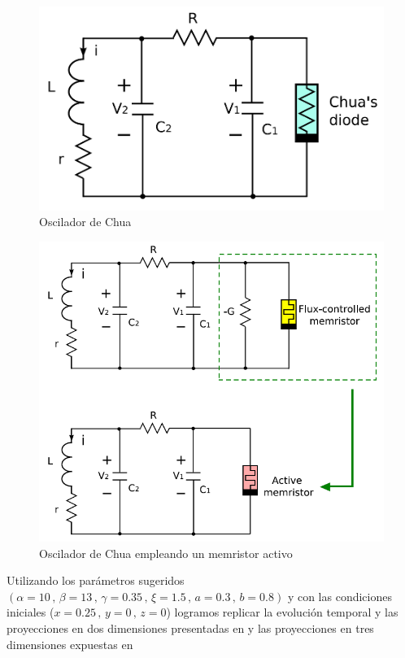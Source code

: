 \documentclass[11pt,letterpaper]{article}
\begin{document}
\begin{multicols*}{2}
\begin{figure}[H]
    \centering
    \includegraphics[scale=0.25]{ChuaOscilator.png}
    \caption{Oscilador de Chua \cite{Itoh2008}}
    \label{Fig:ChuaOscilator}
\end{figure}

\begin{figure}[H]
    \centering
    \includegraphics[scale=0.25]{MemChuaOscilator.png}
    \caption{Oscilador de Chua empleando un memristor activo \cite{Itoh2008}}
    \label{Fig:MemChuaOscilator}
\end{figure}


Utilizando los parámetros sugeridos $(\alpha\!=\!10 \,,\, \beta\!=\!13 \,,\, \gamma\!=\!0.35 \,,\, \xi\!=\!1.5 \,,\,a\!=\!0.3 \,,\, b\!=\!0.8)$ y con las condiciones iniciales ($x\!=\!0.25\,,\,y\!=\!0\,,\,z\!=\!0$) logramos replicar la evolución temporal y las proyecciones en dos dimensiones presentadas en \cite{Buscarino2012a} y las proyecciones en tres dimensiones expuestas en \cite{Itoh2008} 


\end{multicols*}
\end{document}
